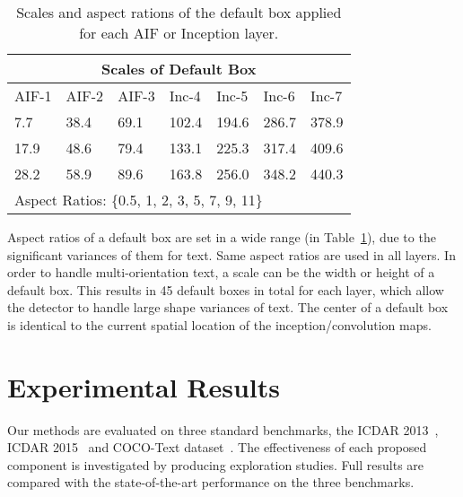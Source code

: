\documentclass[10pt,twocolumn,letterpaper]{article}
\begin{document}
\begin{table}
\centering
\caption{Scales and aspect rations of the default box applied for each AIF or Inception layer.}
\label{tab:scales}
\begin{tabular}{l|l|l|l|l|l|l}
\hline
\multicolumn{7}{c}{Scales of Default Box} \\
\hline
\hline   AIF-1       & AIF-2       & AIF-3       & Inc-4       & Inc-5       & Inc-6        & Inc-7     \\ \hline

7.7 & 38.4 & 69.1 & 102.4 & 194.6 & 286.7& 378.9 \\
17.9 & 48.6 & 79.4 & 133.1 & 225.3 & 317.4& 409.6 \\
28.2 & 58.9 & 89.6 & 163.8 & 256.0 & 348.2 & 440.3 \\  \hline\hline
\multicolumn{7}{l}{Aspect Ratios: \{0.5, 1, 2, 3, 5, 7, 9, 11\} }\\\hline
\end{tabular}
\end{table}

Aspect ratios of a default box are set in a wide range (in Table~\ref{tab:scales}), due to the significant variances of them for text. Same aspect ratios are used in all layers. In order to handle multi-orientation text, a scale can be the width or height of a default box. This results in 45 default boxes in total for each layer, which allow the detector to handle large shape variances of text. The center of a default box is identical to the current spatial location of the inception/convolution maps.

\section{Experimental Results}
Our methods are evaluated on three standard benchmarks, the ICDAR 2013~\cite{Karatzas2013}, ICDAR 2015~\cite{Karatzas2015} and COCO-Text dataset~\cite{veit2016cocotext}.
The effectiveness of each proposed component is investigated by producing exploration studies.  Full results are compared with the state-of-the-art performance on the three benchmarks.
\end{document}
